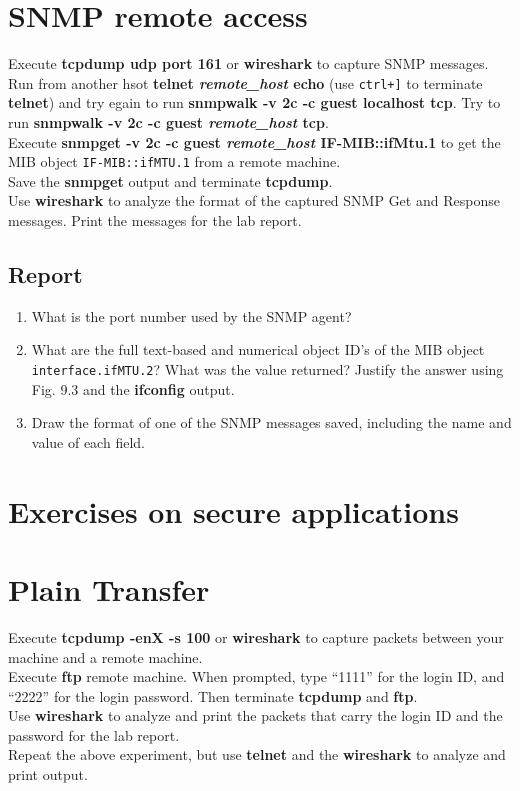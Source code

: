 \documentclass[10pt,a4paper]{article}
\numberwithin{equation}{section}
\numberwithin{figure}{section}
\numberwithin{table}{section}
\begin{document}
\section{SNMP remote access}
	Execute \textbf{tcpdump udp port 161} or \textbf{wireshark} to capture SNMP messages.\\
	Run from another hsot \textbf{telnet \textit{remote\_host} echo} (use \texttt{ctrl+]} to terminate \textbf{telnet}) and try egain to run \textbf{snmpwalk -v 2c -c guest localhost tcp}. Try to run \textbf{snmpwalk -v 2c -c guest \textit{remote\_host} tcp}.\\
	Execute \textbf{snmpget -v 2c -c guest \textit{remote\_host} IF-MIB::ifMtu.1} to get the MIB object \texttt{IF-MIB::ifMTU.1} from a remote machine.\\
	Save the \textbf{snmpget} output and terminate \textbf{tcpdump}.\\
	Use \textbf{wireshark} to analyze the format of the captured SNMP Get and Response messages. Print the messages for the lab report.
	
	\subsection*{Report}
	\begin{enumerate}
		\item What is the port number used by the SNMP agent?
		\item What are the full text-based and numerical object ID’s of the MIB object \texttt{interface.ifMTU.2}? What was the value returned? Justify the answer using Fig. 9.3 and the \textbf{ifconfig} output.
		\item Draw the format of one of the SNMP messages saved, including the name and value of each field.
	\end{enumerate}

\section*{Exercises on secure applications}
	
\section{Plain Transfer}
	Execute \textbf{tcpdump -enX -s 100} or \textbf{wireshark} to capture packets between your machine and a remote machine.\\
	Execute \textbf{ftp} remote machine. When prompted, type “1111” for the login ID, and “2222” for the login password. Then terminate \textbf{tcpdump} and \textbf{ftp}.\\
	Use \textbf{wireshark} to analyze and print the packets that carry the login ID and the password for the lab report.\\
	Repeat the above experiment, but use \textbf{telnet} and the \textbf{wireshark} to analyze and print output.
\end{document}
